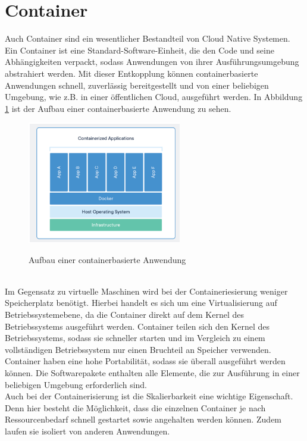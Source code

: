 \section{Container}
Auch Container sind ein wesentlicher Bestandteil von Cloud Native Systemen. \\
Ein Container ist eine Standard-Software-Einheit, die den Code und seine Abhängigkeiten verpackt, sodass Anwendungen von ihrer Ausführungsumgebung abstrahiert werden. Mit dieser Entkopplung können containerbasierte Anwendungen schnell, zuverlässig bereitgestellt und von einer beliebigen Umgebung, wie z.B. in einer öffentlichen Cloud, ausgeführt werden. In Abbildung \ref{container} ist der Aufbau einer containerbasierte Anwendung zu sehen.\\
\begin{figure}[bth] 
	\centering
	\includegraphics[width=0.6\textwidth]{Graphics/Container.png}
	\caption{Aufbau einer containerbasierte Anwendung}
	\label{container}
	\cite{container}
\end{figure}\\
Im Gegensatz zu virtuelle Maschinen wird bei der Containeriesierung weniger Speicherplatz benötigt. Hierbei handelt es sich um eine Virtualisierung auf Betriebssystemebene, da die Container direkt auf dem Kernel des Betriebssystems ausgeführt werden. Container teilen sich den Kernel des Betriebssystems, sodass sie schneller starten und im Vergleich zu einem vollständigen Betriebssystem nur einen Bruchteil an Speicher verwenden.\\
Container haben eine hohe Portabilität, sodass sie überall ausgeführt werden können. Die Softwarepakete enthalten alle Elemente, die zur Ausführung in einer beliebigen Umgebung erforderlich sind.\\
Auch bei der Containerisierung ist die Skalierbarkeit eine wichtige Eigenschaft. Denn hier besteht die Möglichkeit, dass die einzelnen Container je nach Ressourcenbedarf schnell gestartet sowie angehalten werden können. Zudem laufen sie isoliert von anderen Anwendungen.\\
